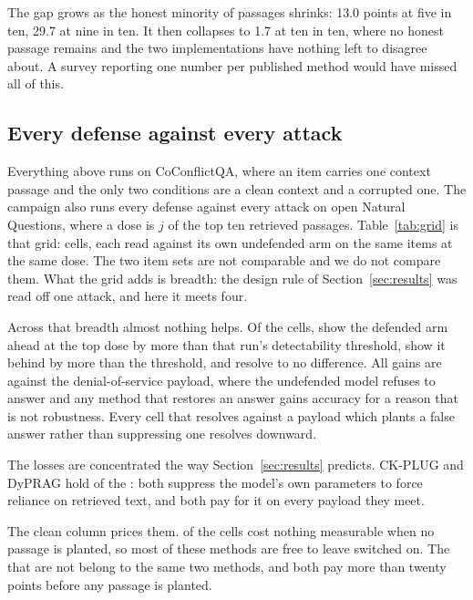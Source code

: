 The gap grows as the honest minority of passages shrinks: 13.0 points at five
in ten, 29.7 at nine in ten. It then collapses to 1.7 at ten in ten, where no
honest passage remains and the two implementations have nothing left to
disagree about. A survey reporting one number per published method would have
missed all of this.

\subsection{Every defense against every attack}
\label{sec:grid}

Everything above runs on CoConflictQA, where an item carries one context
passage and the only two conditions are a clean context and a corrupted one.
The campaign also runs every defense against every attack on open Natural
Questions, where a dose is $j$ of the top ten retrieved passages.
Table~\ref{tab:grid} is that grid: \NGridCells{} cells, each read against
its own undefended arm on the same items at the same dose. The two item sets
are not comparable and we do not compare them. What the grid adds is breadth:
the design rule of Section~\ref{sec:results} was read off one attack, and
here it meets four.

Across that breadth almost nothing helps. Of the \NGridCells{} cells,
\NGridGainTop{} show the defended arm ahead at the top dose by more than
that run's detectability threshold, \NGridLoseTop{} show it behind by more
than the threshold, and \NGridFlatTop{} resolve to no difference. All
\NGridGainTop{} gains are against the denial-of-service payload, where the
undefended model refuses to answer and any method that restores an answer
gains accuracy for a reason that is not robustness. Every cell that resolves
against a payload which plants a false answer rather than suppressing one
resolves downward.

The losses are concentrated the way Section~\ref{sec:results} predicts.
CK-PLUG and DyPRAG hold \NGridLoseTopTwo{} of the \NGridLoseTop{}: both
suppress the model's own parameters to force reliance on retrieved text, and
both pay for it on every payload they meet.

The clean column prices them. \NGridFreeClean{} of the \NGridCells{} cells
cost nothing measurable when no passage is planted, so most of these methods
are free to leave switched on. The \NGridCostClean{} that are not belong to
the same two methods, and both pay more than twenty points before any
passage is planted.

